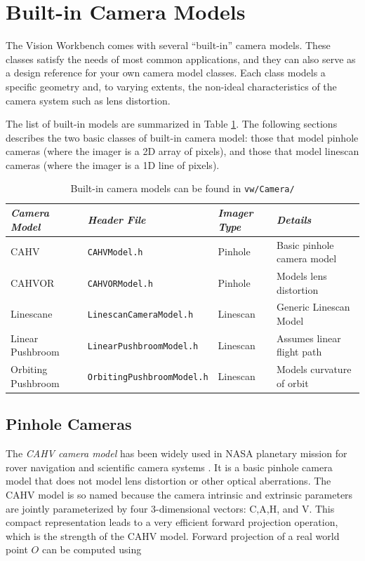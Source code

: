 \section{Built-in Camera Models}
\label{sec:built-in-cameras}
The Vision Workbench comes with several ``built-in'' camera models.
These classes satisfy the needs of most common applications, and they
can also serve as a design reference for your own camera model
classes.  Each class models a specific geometry and, to varying
extents, the non-ideal characteristics of the camera system such as
lens distortion.

The list of built-in models are summarized in Table
\ref{tab:camera-models}.  The following sections describes the two
basic classes of built-in camera model: those that model pinhole
cameras (where the imager is a 2D array of pixels), and those that
model linescan cameras (where the imager is a 1D line of pixels).

\begin{table}[tdp]
\begin{center}
\begin{tabular}{|l|l|l|l|}
\hline
{\em Camera Model} & {\em Header File} & {\em Imager Type} & {\em Details}\\
\hline CAHV         & {\tt CAHVModel.h} & Pinhole     & Basic pinhole camera model \\
CAHVOR       & {\tt CAHVORModel.h} & Pinhole     & Models lens distortion\\
Linescane     & {\tt LinescanCameraModel.h} & Linescan & Generic Linescan Model \\
Linear Pushbroom    & {\tt LinearPushbroomModel.h} & Linescan & Assumes linear flight path \\
Orbiting Pushbroom & {\tt OrbitingPushbroomModel.h} & Linescan & Models curvature of orbit \\
\hline
\end{tabular}
\end{center}
\label{tab:camera-models}
\caption{Built-in camera models can be found in {\tt vw/Camera/} }
\end{table}

\subsection{Pinhole Cameras}

The {\em CAHV camera model} has been widely used in NASA planetary
mission for rover navigation and scientific camera systems
\cite{yakimovsky78}.  It is a basic pinhole camera model that does not
model lens distortion or other optical aberrations.  The CAHV model is
so named because the camera intrinsic and extrinsic parameters are
jointly parameterized by four 3-dimensional vectors: C,A,H, and V.
This compact representation leads to a very efficient forward
projection operation, which is the strength of the CAHV model.
Forward projection of a real world point $O$ can be computed using

